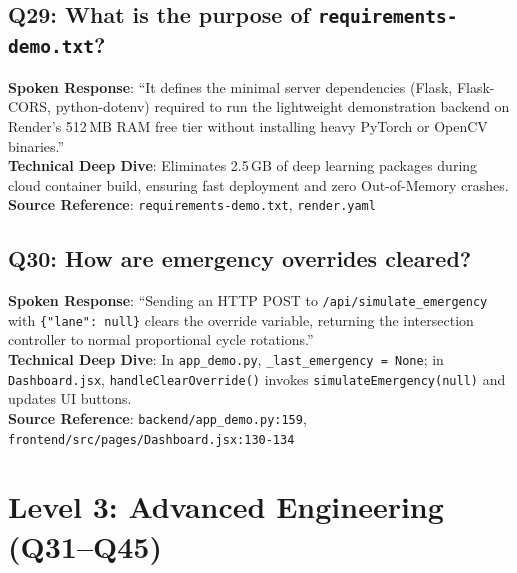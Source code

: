 \subsection*{Q29: What is the purpose of \texttt{requirements-demo.txt}?}
\begin{interviewbox}
\textbf{Spoken Response}: ``It defines the minimal server dependencies (Flask, Flask-CORS, python-dotenv) required to run the lightweight demonstration backend on Render's 512\,MB RAM free tier without installing heavy PyTorch or OpenCV binaries.''\\
\textbf{Technical Deep Dive}: Eliminates 2.5\,GB of deep learning packages during cloud container build, ensuring fast deployment and zero Out-of-Memory crashes.\\
\textbf{Source Reference}: \texttt{requirements-demo.txt}, \texttt{render.yaml}
\end{interviewbox}

\subsection*{Q30: How are emergency overrides cleared?}
\begin{interviewbox}
\textbf{Spoken Response}: ``Sending an HTTP POST to \texttt{/api/simulate\_emergency} with \texttt{\{"lane": null\}} clears the override variable, returning the intersection controller to normal proportional cycle rotations.''\\
\textbf{Technical Deep Dive}: In \texttt{app\_demo.py}, \texttt{\_last\_emergency = None}; in \texttt{Dashboard.jsx}, \texttt{handleClearOverride()} invokes \texttt{simulateEmergency(null)} and updates UI buttons.\\
\textbf{Source Reference}: \texttt{backend/app\_demo.py:159}, \texttt{frontend/src/pages/Dashboard.jsx:130-134}
\end{interviewbox}

\section{Level 3: Advanced Engineering (Q31--Q45)}

